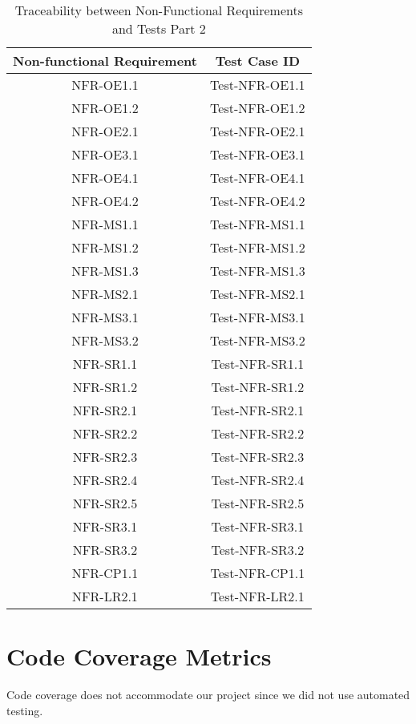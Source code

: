 \documentclass[12pt, titlepage]{article}
\begin{document}
\begin{table}[H]
    \centering
    \begin{tabular}{|c|c|}
    \hline
    Non-functional Requirement & Test Case ID\\
    \hline
    NFR-OE1.1 & Test-NFR-OE1.1\\
    \hline
    NFR-OE1.2 & Test-NFR-OE1.2\\
    \hline
    NFR-OE2.1 & Test-NFR-OE2.1\\
    \hline
    NFR-OE3.1 & Test-NFR-OE3.1\\
    \hline
    NFR-OE4.1 & Test-NFR-OE4.1\\
    \hline
    NFR-OE4.2 & Test-NFR-OE4.2\\
    \hline
    NFR-MS1.1 & Test-NFR-MS1.1\\
    \hline
    NFR-MS1.2 & Test-NFR-MS1.2\\
    \hline
    NFR-MS1.3 & Test-NFR-MS1.3\\
    \hline
    NFR-MS2.1 & Test-NFR-MS2.1\\
    \hline
    NFR-MS3.1 & Test-NFR-MS3.1\\
    \hline
    NFR-MS3.2 & Test-NFR-MS3.2\\
    \hline
    NFR-SR1.1 & Test-NFR-SR1.1\\
    \hline
    NFR-SR1.2 & Test-NFR-SR1.2\\
    \hline
    NFR-SR2.1 & Test-NFR-SR2.1\\
    \hline
    NFR-SR2.2 & Test-NFR-SR2.2\\
    \hline
    NFR-SR2.3 & Test-NFR-SR2.3\\
    \hline
    NFR-SR2.4 & Test-NFR-SR2.4\\
    \hline
    NFR-SR2.5 & Test-NFR-SR2.5\\
    \hline
    NFR-SR3.1 & Test-NFR-SR3.1\\
    \hline
    NFR-SR3.2 & Test-NFR-SR3.2\\
    \hline
    NFR-CP1.1 & Test-NFR-CP1.1\\
    \hline
    NFR-LR2.1 & Test-NFR-LR2.1\\
    \hline
    \end{tabular}
    \caption{Traceability between Non-Functional Requirements and Tests Part 2}
\end{table}

\newpage

\section{Code Coverage Metrics}
Code coverage does not accommodate our project since we did not use automated testing.
\end{document}
